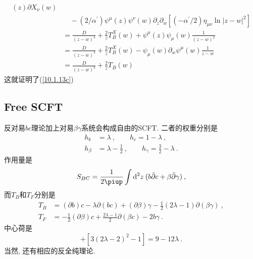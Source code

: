 \begin{tcolorbox}
\begin{align*}
{}(z)\partial X_{\nu }(w)\\
&\quad-(2/\alpha ^{\prime })\psi ^{\mu }(z)\psi ^{\nu
}(w)\partial _{z}\partial _{w}[(-\alpha ^{\prime }/2)\eta _{\mu \nu }\ln
|z-w|^{2}] \\
&=\frac{D}{(z-w)^{3}}+\frac{2}{z}T_{B}^{X}(w)+\psi ^{\mu }(z)\psi _{\mu }(w)%
\frac{1}{(z-w)^{2}} \\
&=\frac{D}{(z-w)^{3}}+\frac{2}{z}T_{B}^{X}(w)-\psi _{\mu }(w)\partial
_{w}\psi ^{\mu }(w)\frac{1}{z-w} \\
&=\frac{D}{(z-w)^{3}}+\frac{2}{z}T_{B}(w)
\end{align*}
这就证明了(\ref{10.1.13c})
\end{tcolorbox}

\subsection*{Free SCFT}
反对易$bc$理论加上对易$\beta\gamma$系统会构成自由的SCFT. 二者的权重分别是
\begin{subequations}
\begin{align}
    h_{b}&=\lambda\:,\qquad h_{c}=1-\lambda \:, \label{10.1.16a} \\
    h_{\beta}&=\lambda-\tfrac{1}{2}\:,\qquad h_{\gamma}=\tfrac{3}{2}-\lambda \:. \label{10.1.16b}
\end{align}
\end{subequations}
作用量是
\begin{equation}
    S_{BC}=\frac{1}{2\uppi}\int\dif^{2}z\: (b\bar{\partial}c+\beta\bar{\partial}\gamma)\:, \label{10.1.17}
\end{equation}
而$T_{B}$和$T_{F}$分别是
\begin{subequations}
\begin{align}
    T_{B}&=(\partial b)c-\lambda\partial(bc)+(\partial \beta)\gamma-\frac{1}{2}(2\lambda-1)\partial(\beta\gamma)\:,
    \label{10.1.18a} \\
    T_{F}&=-\frac{1}{2}(\partial \beta)c+ \frac{2\lambda-1}{2}\partial(\beta c)-2b\gamma\:.\label{10.1.18b}
\end{align}
\end{subequations}
中心荷是
\begin{equation}
    [-3(2\lambda-1)^{2}+1]+[3(2\lambda-2)^{2}-1]=9-12\lambda\:.\label{10.1.19}
\end{equation}
当然, 还有相应的反全纯理论.

